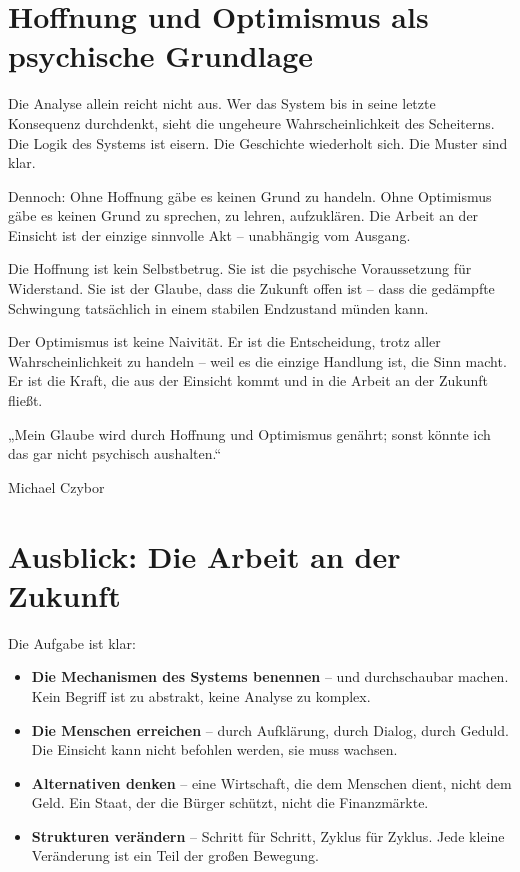 \documentclass[12pt,a4paper]{book}
\begin{document}
\chapter{Hoffnung und Optimismus als psychische Grundlage}

Die Analyse allein reicht nicht aus. Wer das System bis in seine letzte Konsequenz durchdenkt, sieht die ungeheure Wahrscheinlichkeit des Scheiterns. Die Logik des Systems ist eisern. Die Geschichte wiederholt sich. Die Muster sind klar.

Dennoch: Ohne Hoffnung gäbe es keinen Grund zu handeln. Ohne Optimismus gäbe es keinen Grund zu sprechen, zu lehren, aufzuklären. Die Arbeit an der Einsicht ist der einzige sinnvolle Akt – unabhängig vom Ausgang.

Die Hoffnung ist kein Selbstbetrug. Sie ist die psychische Voraussetzung für Widerstand. Sie ist der Glaube, dass die Zukunft offen ist – dass die gedämpfte Schwingung tatsächlich in einem stabilen Endzustand münden kann.

Der Optimismus ist keine Naivität. Er ist die Entscheidung, trotz aller Wahrscheinlichkeit zu handeln – weil es die einzige Handlung ist, die Sinn macht. Er ist die Kraft, die aus der Einsicht kommt und in die Arbeit an der Zukunft fließt.

\epigraph{„Mein Glaube wird durch Hoffnung und Optimismus genährt; sonst könnte ich das gar nicht psychisch aushalten.“}{Michael Czybor}

\chapter{Ausblick: Die Arbeit an der Zukunft}

Die Aufgabe ist klar:

\begin{itemize}
    \item \textbf{Die Mechanismen des Systems benennen} – und durchschaubar machen. Kein Begriff ist zu abstrakt, keine Analyse zu komplex.
    \item \textbf{Die Menschen erreichen} – durch Aufklärung, durch Dialog, durch Geduld. Die Einsicht kann nicht befohlen werden, sie muss wachsen.
    \item \textbf{Alternativen denken} – eine Wirtschaft, die dem Menschen dient, nicht dem Geld. Ein Staat, der die Bürger schützt, nicht die Finanzmärkte.
    \item \textbf{Strukturen verändern} – Schritt für Schritt, Zyklus für Zyklus. Jede kleine Veränderung ist ein Teil der großen Bewegung.
\end{itemize}
\end{document}

